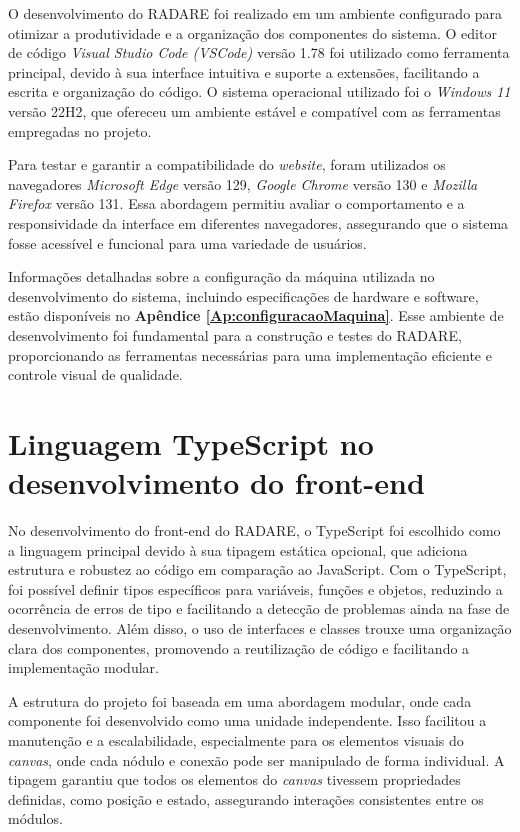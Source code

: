 O desenvolvimento do RADARE foi realizado em um ambiente configurado para otimizar a produtividade e a organização dos componentes do sistema. O editor de código \textit{Visual Studio Code (VSCode)} versão 1.78 foi utilizado como ferramenta principal, devido à sua interface intuitiva e suporte a extensões, facilitando a escrita e organização do código. O sistema operacional utilizado foi o \textit{Windows 11} versão 22H2, que ofereceu um ambiente estável e compatível com as ferramentas empregadas no projeto.

Para testar e garantir a compatibilidade do \textit{website}, foram utilizados os navegadores \textit{Microsoft Edge} versão 129, \textit{Google Chrome} versão 130 e \textit{Mozilla Firefox} versão 131. Essa abordagem permitiu avaliar o comportamento e a responsividade da interface em diferentes navegadores, assegurando que o sistema fosse acessível e funcional para uma variedade de usuários.

Informações detalhadas sobre a configuração da máquina utilizada no desenvolvimento do sistema, incluindo especificações de hardware e software, estão disponíveis no \textbf{Apêndice \ref{Ap:configuracaoMaquina}}. Esse ambiente de desenvolvimento foi fundamental para a construção e testes do RADARE, proporcionando as ferramentas necessárias para uma implementação eficiente e controle visual de qualidade.
    
\section{Linguagem TypeScript no desenvolvimento do front-end}

No desenvolvimento do front-end do RADARE, o TypeScript foi escolhido como a linguagem principal devido à sua tipagem estática opcional, que adiciona estrutura e robustez ao código em comparação ao JavaScript. Com o TypeScript, foi possível definir tipos específicos para variáveis, funções e objetos, reduzindo a ocorrência de erros de tipo e facilitando a detecção de problemas ainda na fase de desenvolvimento. Além disso, o uso de interfaces e classes trouxe uma organização clara dos componentes, promovendo a reutilização de código e facilitando a implementação modular.

A estrutura do projeto foi baseada em uma abordagem modular, onde cada componente foi desenvolvido como uma unidade independente. Isso facilitou a manutenção e a escalabilidade, especialmente para os elementos visuais do \textit{canvas}, onde cada nódulo e conexão pode ser manipulado de forma individual. A tipagem garantiu que todos os elementos do \textit{canvas} tivessem propriedades definidas, como posição e estado, assegurando interações consistentes entre os módulos.


